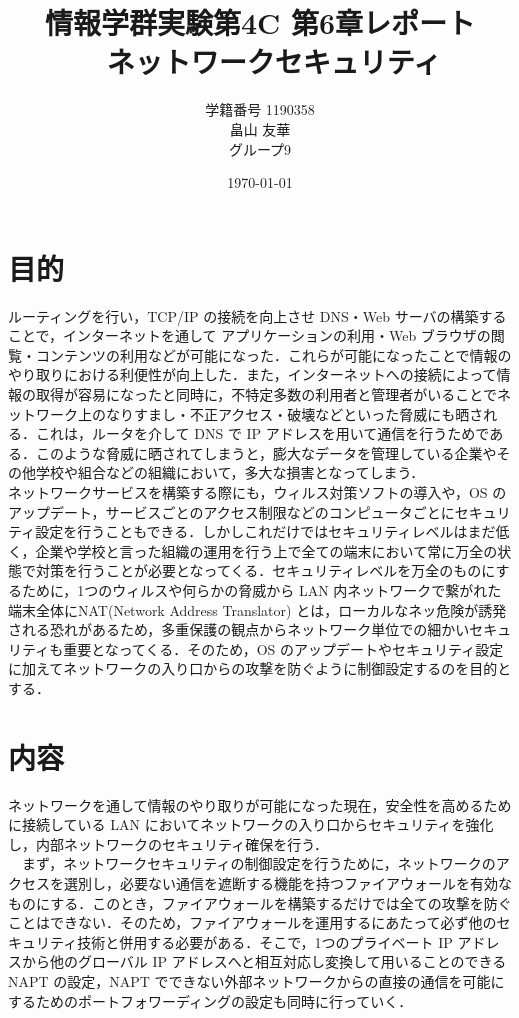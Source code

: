 \documentclass[a4j,titlepage]{jarticle}
\title{情報学群実験第4C 第6章レポート\\　ネットワークセキュリティ}
\author{学籍番号 1190358\\
        畠山 友華\\
        グループ9}
\date{\today}
\begin{document}
\maketitle
\section{目的}
ルーティングを行い，TCP/IP の接続を向上させ DNS・Web サーバの構築することで，インターネットを通して アプリケーションの利用・Web ブラウザの閲覧・コンテンツの利用などが可能になった．これらが可能になったことで情報のやり取りにおける利便性が向上した．また，インターネットへの接続によって情報の取得が容易になったと同時に，不特定多数の利用者と管理者がいることでネットワーク上のなりすまし・不正アクセス・破壊などといった脅威にも晒される．これは，ルータを介して DNS で IP アドレスを用いて通信を行うためである．このような脅威に晒されてしまうと，膨大なデータを管理している企業やその他学校や組合などの組織において，多大な損害となってしまう．\\
ネットワークサービスを構築する際にも，ウィルス対策ソフトの導入や，OS のアップデート，サービスごとのアクセス制限などのコンピュータごとにセキュリティ設定を行うこともできる．しかしこれだけではセキュリティレベルはまだ低く，企業や学校と言った組織の運用を行う上で全ての端末において常に万全の状態で対策を行うことが必要となってくる．セキュリティレベルを万全のものにするために，1つのウィルスや何らかの脅威から LAN 内ネットワークで繋がれた端末全体にNAT(Network Address Translator) とは，ローカルなネッ危険が誘発される恐れがあるため，多重保護の観点からネットワーク単位での細かいセキュリティも重要となってくる．そのため，OS のアップデートやセキュリティ設定に加えてネットワークの入り口からの攻撃を防ぐように制御設定するのを目的とする．

\section{内容}
ネットワークを通して情報のやり取りが可能になった現在，安全性を高めるために接続している LAN においてネットワークの入り口からセキュリティを強化し，内部ネットワークのセキュリティ確保を行う．\\
　まず，ネットワークセキュリティの制御設定を行うために，ネットワークのアクセスを選別し，必要ない通信を遮断する機能を持つファイアウォールを有効なものにする．このとき，ファイアウォールを構築するだけでは全ての攻撃を防ぐことはできない．そのため，ファイアウォールを運用するにあたって必ず他のセキュリティ技術と併用する必要がある．そこで，1つのプライベート IP アドレスから他のグローバル IP アドレスへと相互対応し変換して用いることのできる NAPT の設定，NAPT でできない外部ネットワークからの直接の通信を可能にするためのポートフォワーディングの設定も同時に行っていく．
\end{document}
